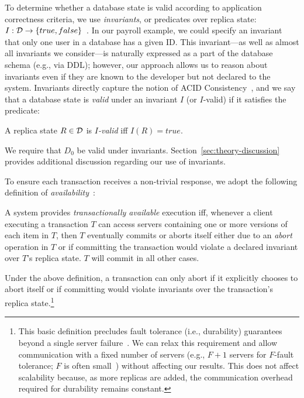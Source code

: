  To determine whether a database state is valid
according to application correctness criteria, we use
\textit{invariants}, or predicates over replica state: $I: {\cal D}
\rightarrow \{true, false\}$~\cite{eswaran-consistency}.  In our
payroll example, we could specify an invariant that only one user in a
database has a given ID. This invariant---as well as almost all
invariants we consider---is naturally expressed as a part of the
database schema (e.g., via DDL); however, our approach allows us to
reason about invariants even if they are known to the developer but
not declared to the system. Invariants directly capture the notion of
ACID Consistency~\cite{bernstein-book,gray-virtues}, and we say that a
database state is \textit{valid} under an invariant $I$ (or $I$-valid)
if it satisfies the predicate:

\begin{definition}
A replica state $R \in {\cal D}$ is \textit{$I$-valid} iff $I(R) = true$.
\end{definition}

We require that $D_0$ be valid under
invariants. Section~\ref{sec:theory-discussion} provides additional discussion
regarding our use of invariants.


 To ensure each transaction receives a
non-trivial response,
we adopt the following definition of
\textit{availability}~\cite{hat-vldb}:

\begin{definition} 
  A system provides \textit{transactionally available} execution iff,
  whenever a client executing a transaction $T$ can access servers
  containing one or more versions of each item in $T$, then $T$
  eventually commits or aborts itself either due to an \textit{abort}
  operation in $T$ or if committing the transaction would violate a
  declared invariant over $T$'s replica state. $T$ will commit in all
  other cases.
\end{definition}

Under the above definition, a transaction can only abort if it
explicitly chooses to abort itself or if committing would violate
invariants over the transaction's replica state.\footnote{This basic
  definition precludes fault tolerance (i.e., durability) guarantees
  beyond a single server failure~\cite{hat-vldb}. We can relax this
  requirement and allow communication with a fixed number of servers
  (e.g., $F+1$ servers for $F$-fault tolerance; $F$ is often
  small~\cite{dynamo}) without affecting our results. This does not
  affect scalability because, as more replicas are added, the
  communication overhead required for durability remains constant.}



